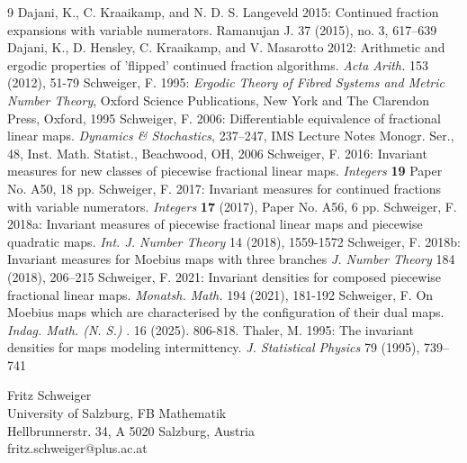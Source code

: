 \documentclass[12pt]{article}
\begin{document}
\begin{thebibliography}{9}
		 Dajani, K., C. Kraaikamp, and N. D. S. Langeveld 2015:  Continued fraction expansions with variable numerators. Ramanujan J. 37 (2015), no. 3, 617--639
		 Dajani, K., D. Hensley, C. Kraaikamp, and V. Masarotto 2012: Arithmetic and ergodic properties of 'flipped' continued fraction algorithms. {\em Acta Arith.} 153 (2012), 51-79  
		Schweiger, F. 1995: {\it Ergodic Theory of Fibred Systems and Metric Number Theory}, Oxford Science Publications, New York and The Clarendon Press,  Oxford, 1995
		Schweiger, F.  2006:  Differentiable equivalence of fractional linear maps. {\em Dynamics \& Stochastics}, 237--247,
		IMS Lecture Notes Monogr. Ser., 48, Inst. Math. Statist., Beachwood, OH, 2006
		 Schweiger, F. 2016: Invariant measures for new classes of piecewise fractional linear maps. {\em Integers} {\bf 19} Paper No.  A50, 18 pp.
		Schweiger, F. 2017:   
		Invariant measures for continued fractions with variable numerators.
		{\it Integers} {\bf 17} (2017), Paper No. A56, 6 pp.
		Schweiger, F. 2018a: Invariant measures of piecewise fractional linear maps and piecewise quadratic maps. { \em Int. J. Number Theory} 14 (2018), 1559-1572
		 Schweiger, F. 2018b: Invariant measures for Moebius maps with three branches {\em  J. Number Theory} 184 (2018), 206–215
	  Schweiger, F. 2021: Invariant densities for composed piecewise fractional linear maps. {\em Monatsh.  Math.} 194 (2021), 181-192
	  Schweiger, F.  On Moebius maps which are characterised by the configuration of their dual maps. {\em Indag. Math. (N. S.)} . 16 (2025). 806-818. 
	 Thaler, M. 1995: The invariant densities for maps modeling intermittency. {\em J. Statistical Physics} 79 (1995), 739--741
	\end{thebibliography}

Fritz Schweiger\\
University of Salzburg, FB Mathematik\\
Hellbrunnerstr. 34, A 5020 Salzburg, Austria\\
fritz.schweiger@plus.ac.at
	
\end{document}
